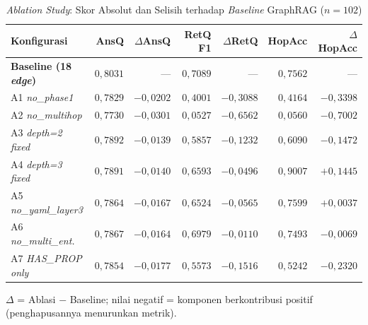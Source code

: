 \renewcommand{\arraystretch}{1.3}
\captionsetup[table]{justification=raggedright,singlelinecheck=false}
\begin{table}[H]
\caption{\textit{Ablation Study}: Skor Absolut dan Selisih terhadap \textit{Baseline} GraphRAG ($n{=}102$)}
\label{tbl:ablation_results}
\centering
\begin{footnotesize}
\setlength{\tabcolsep}{5pt}
\begin{tabular}{| p{} | r | r | r | r | r | r |}
\hline
\textbf{Konfigurasi} & \textbf{AnsQ} & \textbf{$\Delta$AnsQ} & \textbf{RetQ F1} & \textbf{$\Delta$RetQ} & \textbf{HopAcc} & \textbf{$\Delta$HopAcc} \\
\hline
\textbf{Baseline (18 \textit{edge})} & $0{,}8031$ & --- & $0{,}7089$ & --- & $0{,}7562$ & --- \\
\hline
A1 \textit{no\_phase1}       & $0{,}7829$ & $-0{,}0202$ & $0{,}4001$ & $-0{,}3088$ & $0{,}4164$ & $-0{,}3398$ \\
\hline
A2 \textit{no\_multihop}     & $0{,}7730$ & $-0{,}0301$ & $0{,}0527$ & $-0{,}6562$ & $0{,}0560$ & $-0{,}7002$ \\
\hline
A3 \textit{depth=2 fixed}    & $0{,}7892$ & $-0{,}0139$ & $0{,}5857$ & $-0{,}1232$ & $0{,}6090$ & $-0{,}1472$ \\
\hline
A4 \textit{depth=3 fixed}    & $0{,}7891$ & $-0{,}0140$ & $0{,}6593$ & $-0{,}0496$ & $0{,}9007$ & $+0{,}1445$ \\
\hline
A5 \textit{no\_yaml\_layer3} & $0{,}7864$ & $-0{,}0167$ & $0{,}6524$ & $-0{,}0565$ & $0{,}7599$ & $+0{,}0037$ \\
\hline
A6 \textit{no\_multi\_ent.} & $0{,}7867$ & $-0{,}0164$ & $0{,}6979$ & $-0{,}0110$ & $0{,}7493$ & $-0{,}0069$ \\
\hline
A7 \textit{HAS\_PROP only}   & $0{,}7854$ & $-0{,}0177$ & $0{,}5573$ & $-0{,}1516$ & $0{,}5242$ & $-0{,}2320$ \\
\hline
\end{tabular}
\end{footnotesize}
\end{table}
{\footnotesize\noindent $\Delta$ = Ablasi $-$ Baseline; nilai negatif = komponen berkontribusi positif (penghapusannya menurunkan metrik).}
